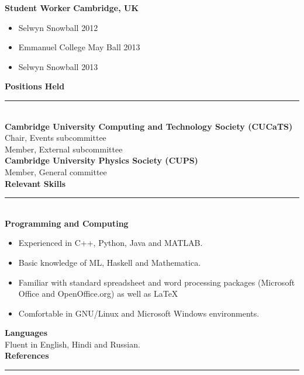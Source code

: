 \documentclass[11pt]{article}
\begin{document}
\noindent\textbf{\large Student Worker} \hfill \textbf{Cambridge, UK}
\begin{itemize}
  \item Selwyn Snowball 2012
  \item Emmanuel College May Ball 2013
  \item Selwyn Snowball 2013
\end{itemize}

\noindent\textbf{\LARGE\sc Positions Held}\\
\rule{480pt}{0.8pt}\\
\noindent\textbf{Cambridge University Computing and Technology Society (CUCaTS)}\\
Chair, Events subcommittee\\
Member, External subcommittee\\

\noindent\textbf{Cambridge University Physics Society (CUPS)}\\
Member, General committee\\

\noindent\textbf{\LARGE\sc Relevant Skills}\\
\rule{480pt}{0.8pt}\\

\noindent\textbf{\large Programming and Computing}
\begin{itemize}
	\item Experienced in C++, Python, Java and MATLAB.
	\item Basic knowledge of ML, Haskell and Mathematica.
	\item Familiar with standard spreadsheet and word processing packages (Microsoft Office and OpenOffice.org) as well as \LaTeX
	\item Comfortable in GNU/Linux and Microsoft Windows environments.
\end{itemize}
\noindent\textbf{\large Languages}\\
Fluent in English, Hindi and Russian.\\

\noindent\textbf{\LARGE\sc References}\\
\rule{480pt}{0.8pt}\\
\end{document}
